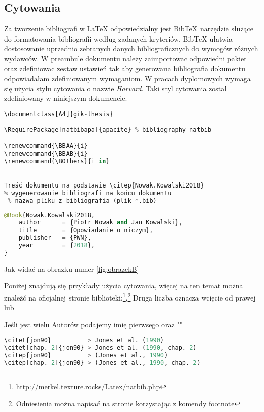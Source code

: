 \subsection{Cytowania}
Za tworzenie bibliografi w \LaTeX{} odpowiedzialny jest Bib\TeX{} narzędzie służące do formatowania bibliografii według zadanych kryteriów. Bib\TeX{} ułatwia dostosowanie uprzednio zebranych danych bibliograficznych do wymogów różnych wydawców. W preambule dokumentu należy zaimportowac odpowiedni pakiet oraz zdefiniowac zestaw ustawień tak aby generowana bibliografia dokumentu odpowiadałam zdefiniowanym wymaganiom. W pracach dyplomowych wymaga się użycia stylu cytowania o nazwie \emph{Harvard}. Taki styl cytowania został zdefiniowany w niniejszym dokumencie.

\begin{lstlisting}[language=Python,	caption={\emph{Dokument LaTeX z bibliografią} }]
\documentclass[A4]{gik-thesis}

\RequirePackage[natbibapa]{apacite} % bibliography natbib

\renewcommand{\BBAA}{i} 
\renewcommand{\BBAB}{i} 
\renewcommand{\BOthers}{i in} 


Treść dokumentu na podstawie \citep{Nowak.Kowalski2018}
% wygenerowanie bibliografi na końcu dokumentu
 % nazwa pliku z bibliografia (plik *.bib) 

\end{lstlisting}


\begin{lstlisting}[language=Python,	caption={\emph{Przykładowy plik \url{bibliografia.bib} } }]
@Book{Nowak.Kowalski2018,
	author      = {Piotr Nowak and Jan Kowalski},
	title       = {Opowiadanie o niczym},
	publisher   = {PWN},
	year        = {2018},
}
\end{lstlisting}

Jak widać na obrazku numer \ref{fig:obrazekB}

Poniżej znajdują się przykłady użycia cytowania, więcej na ten temat można znależć na oficjalnej stronie biblioteki:\footnote{\url{http://merkel.texture.rocks/Latex/natbib.php}},\footnote{Odniesienia można napisać na stronie korzystając z komendy footnote{}}
Druga liczba oznacza wcięcie od prawej \citep{Hofmann-Wellenhof.etal2008} lub \citep[ch.VII]{Teunissen.Montenbruck2017}

Jeśli jest wielu Autorów podajemy imię pierwsego oraz "" \citep{Bertiger.etal2009}

\begin{lstlisting}[language=Python,	caption={Przykłady cytowań}]
\citet{jon90}	       > Jones et al. (1990)
\citet[chap. 2]{jon90} > Jones et al. (1990, chap. 2)
\citep{jon90}	       > (Jones et al., 1990)
\citep[chap. 2]{jon90} > (Jones et al., 1990, chap. 2)
\end{lstlisting}


